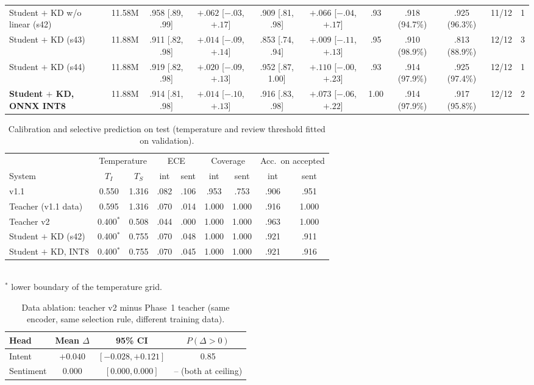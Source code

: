 \documentclass[11pt,a4paper]{article}
\theoremstyle{remark}
\begin{document}
\begin{table}[t]
{\begin{tabular}{@{}l r cc cc c cc c c@{}}
Student $+$ KD w/o linear (s42) & 11.58M & .958 [.89, .99] & $+.062$ [$-.03$, $+.17$] & .909 [.81, .98] & $+.066$ [$-.04$, $+.17$] & .93 & .918 (94.7\%) & .925 (96.3\%) & 11/12 & 1 \\
Student $+$ KD (s43) & 11.88M & .911 [.82, .98] & $+.014$ [$-.09$, $+.14$] & .853 [.74, .94] & $+.009$ [$-.11$, $+.13$] & .95 & .910 (98.9\%) & .813 (88.9\%) & 12/12 & 3 \\
Student $+$ KD (s44) & 11.88M & .919 [.82, .98] & $+.020$ [$-.09$, $+.13$] & .952 [.87, 1.00] & $+.110$ [$-.00$, $+.23$] & .93 & .914 (97.9\%) & .925 (97.4\%) & 12/12 & 1 \\
\textbf{Student $+$ KD, ONNX INT8} & 11.88M & .914 [.81, .98] & $+.014$ [$-.10$, $+.13$] & .916 [.83, .98] & $+.073$ [$-.06$, $+.22$] & 1.00 & .914 (97.9\%) & .917 (95.8\%) & 12/12 & 2 \\
\bottomrule
\end{tabular}}
\end{table}

\begin{table}[h]
\centering\small
\caption{Calibration and selective prediction on test (temperature and review threshold fitted on validation).}
\label{tab:calib}
\begin{tabular}{@{}l cc cc cc cc@{}}
\toprule
& \multicolumn{2}{c}{Temperature} & \multicolumn{2}{c}{ECE} & \multicolumn{2}{c}{Coverage} & \multicolumn{2}{c}{Acc.\ on accepted} \\
\cmidrule(lr){2-3}\cmidrule(lr){4-5}\cmidrule(lr){6-7}\cmidrule(lr){8-9}
System & $T_I$ & $T_S$ & int & sent & int & sent & int & sent \\
\midrule
v1.1 & 0.550 & 1.316 & .082 & .106 & .953 & .753 & .906 & .951 \\
Teacher (v1.1 data) & 0.595 & 1.316 & .070 & .014 & 1.000 & 1.000 & .916 & 1.000 \\
Teacher v2 & 0.400$^\ast$ & 0.508 & .044 & .000 & 1.000 & 1.000 & .963 & 1.000 \\
Student $+$ KD (s42) & 0.400$^\ast$ & 0.755 & .070 & .048 & 1.000 & 1.000 & .921 & .911 \\
Student $+$ KD, INT8 & 0.400$^\ast$ & 0.755 & .070 & .045 & 1.000 & 1.000 & .921 & .916 \\
\bottomrule
\end{tabular}
\\[2pt]{\footnotesize $^\ast$ lower boundary of the temperature grid.}
\end{table}

\begin{table}[h]
\centering\small
\caption{Data ablation: teacher v2 minus Phase~1 teacher (same encoder, same selection rule, different training data).}
\label{tab:ablation}
\begin{tabular}{@{}l c c c@{}}
\toprule
Head & Mean $\Delta$ & 95\% CI & $P(\Delta>0)$ \\
\midrule
Intent & $+0.040$ & $[-0.028, +0.121]$ & 0.85 \\
Sentiment & $0.000$ & $[0.000, 0.000]$ & -- (both at ceiling) \\
\bottomrule
\end{tabular}
\end{table}
\end{document}
